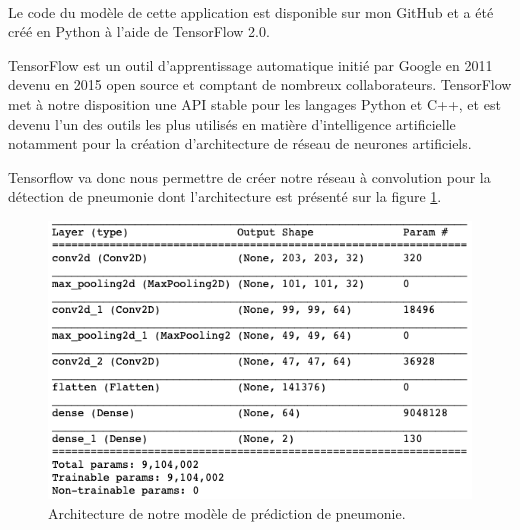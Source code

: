 \paragraph{}Le code du modèle de cette application est disponible sur mon GitHub \cite{pneumoniaDepot} et a été créé en Python à l'aide de TensorFlow 2.0.\par
TensorFlow\cite{tensorflowDepot} est un outil d'apprentissage automatique initié par Google en 2011 devenu en 2015 open source et comptant de nombreux collaborateurs. TensorFlow met à notre disposition une API stable pour les langages Python et C++, et est devenu l'un des outils les plus utilisés en matière d'intelligence artificielle notamment pour la création d'architecture de réseau de neurones artificiels.\par
Tensorflow va donc nous permettre de créer notre réseau à convolution pour la détection de pneumonie dont l'architecture est présenté sur la figure \ref{CNNPneumoniaArchi}.\par
\begin{figure}[h]
    \includegraphics[scale=0.6]{src_img/CNN_pneumonia_archi.png}
    \caption{Architecture de notre modèle de prédiction de pneumonie.}
    \label{CNNPneumoniaArchi}
\end{figure}
